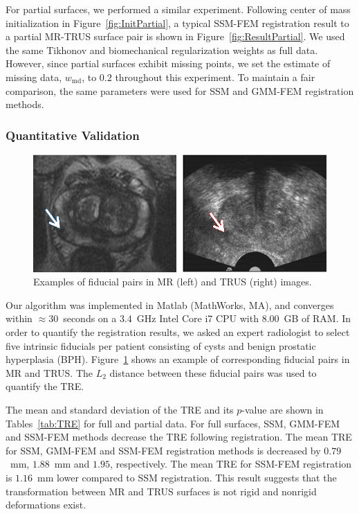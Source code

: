 \documentclass[journal]{IEEEtran}
\begin{document}
For partial surfaces, we performed a similar experiment. Following center of mass initialization in Figure~\ref{fig:InitPartial}, a typical SSM-FEM registration result to a partial MR-TRUS surface pair is shown in Figure~\ref{fig:ResultPartial}. We used the same Tikhonov and biomechanical regularization weights as full data. However, since partial surfaces exhibit missing points, we set the estimate of missing data, $w_\mathrm{md}$, to $0.2$ throughout this experiment. To maintain a fair comparison, the same parameters were used for SSM and GMM-FEM registration methods.
\subsubsection{Quantitative Validation}
\begin{figure}[t]
	\centering
	\includegraphics[width=\columnwidth]{images/FiducialPair}
	\caption{Examples of fiducial pairs in MR (left) and TRUS (right) images.}\label{fig:Fiducial}
\end{figure}
Our algorithm was implemented in Matlab (MathWorks, MA), and converges within $\approx30$~seconds on a $3.4$~GHz Intel Core i7 CPU with $8.00$~GB of RAM. In order to quantify the registration results, we asked an expert radiologist to select five intrinsic fiducials per patient consisting of cysts and benign prostatic hyperplasia (BPH). Figure~\ref{fig:Fiducial} shows an example of corresponding fiducial pairs in MR and TRUS. The $L_2$ distance between these fiducial pairs was used to quantify the TRE.

The mean and standard deviation of the TRE and its $p$-value are shown in Tables~\ref{tab:TRE} for full and partial data. For full surfaces, SSM, GMM-FEM and SSM-FEM methods decrease the TRE following registration. The mean TRE for SSM, GMM-FEM and SSM-FEM registration methods is decreased by $0.79$~mm, $1.88$~mm and $1.95$, respectively. The mean TRE for SSM-FEM registration is $1.16$~mm lower compared to SSM registration. This result suggests that the transformation between MR and TRUS surfaces is not rigid and nonrigid deformations exist. 
\end{document}
